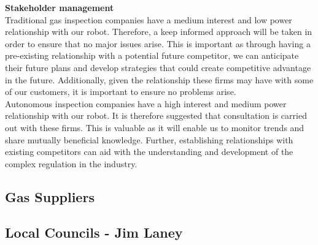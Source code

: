 \documentclass[11pt]{article}		%
\begin{document}
            \textbf{Stakeholder management}\\
            Traditional gas inspection companies have a medium interest and low power relationship with our robot. Therefore, a keep informed approach will be taken in order to ensure that no major issues arise. This is important as through having a pre-existing relationship with a potential future competitor, we can anticipate their future plans and develop strategies that could create competitive advantage in the future. Additionally, given the relationship these firms may have with some of our customers, it is important to ensure no problems arise. \\
            \hspace*{3ex}Autonomous inspection companies have a high interest and medium power relationship with our robot. It is therefore suggested that consultation is carried out with these firms. This is valuable as it will enable us to monitor trends and share mutually beneficial knowledge. Further, establishing relationships with existing competitors can aid with the understanding and development of the complex regulation in the industry.

            
            


		
		\subsection[Gas Suppliers]{Gas Suppliers}
		
		\subsection[Local Councils]{Local Councils - Jim Laney}
			
\end{document}
